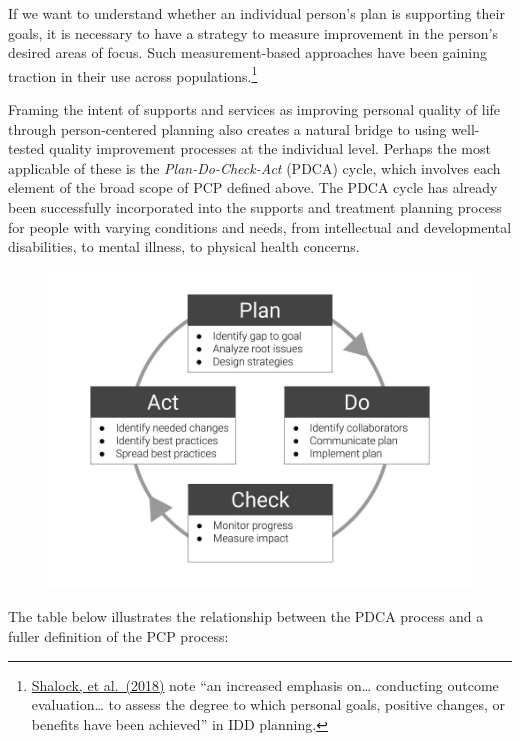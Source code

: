 \documentclass[
]{book}
\begin{document}
If we want to understand whether an individual person's plan is supporting their goals, it is necessary to have a strategy to measure improvement in the person's desired areas of focus. Such measurement-based approaches have been gaining traction in their use across populations.\footnote{\href{https://aaidd.org/docs/default-source/sis-docs/changes-in-the-field.pdf?sfvrsn=cd8b3021_0}{Shalock, et al.~(2018)} note ``an increased emphasis on\ldots{} conducting outcome evaluation\ldots{} to assess the degree to which personal goals, positive changes, or benefits have been achieved'' in IDD planning.}

Framing the intent of supports and services as improving personal quality of life through person-centered planning also creates a natural bridge to using well-tested quality improvement processes at the individual level. Perhaps the most applicable of these is the \emph{Plan-Do-Check-Act} (PDCA) cycle, which involves each element of the broad scope of PCP defined above. The PDCA cycle has already been successfully incorporated into the supports and treatment planning process for people with varying conditions and needs, from intellectual and developmental disabilities, to mental illness, to physical health concerns.

\begin{figure}
\includegraphics[width=24in]{_bookdown_files/img/pdca} \end{figure}

The table below illustrates the relationship between the PDCA process and a fuller definition of the PCP process:
\end{document}
